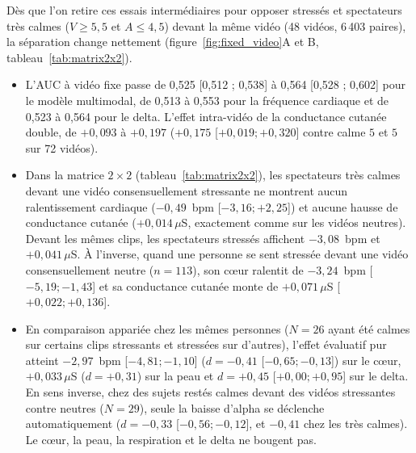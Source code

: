 \documentclass[10pt]{article}
\begin{document}
Dès que l'on retire ces essais intermédiaires pour opposer stressés et spectateurs très calmes ($V \ge 5{,}5$ et $A \le 4{,}5$) devant la même vidéo (48 vidéos, 6\,403 paires), la séparation change nettement (figure~\ref{fig:fixed_video}A et B, tableau~\ref{tab:matrix2x2}).
\begin{itemize}
\item L'AUC à vidéo fixe passe de 0,525 [0,512 ; 0,538] à 0,564 [0,528 ; 0,602] pour le modèle multimodal, de 0,513 à 0,553 pour la fréquence cardiaque et de 0,523 à 0,564 pour le delta. L'effet intra-vidéo de la conductance cutanée double, de $+0{,}093$ à $+0{,}197$ ($+0{,}175$ [$+0{,}019 ; +0{,}320$] contre calme $5$ et $5$ sur 72 vidéos).
\item Dans la matrice $2 \times 2$ (tableau~\ref{tab:matrix2x2}), les spectateurs très calmes devant une vidéo consensuellement stressante ne montrent aucun ralentissement cardiaque ($-0{,}49$~bpm [$-3{,}16 ; +2{,}25$]) et aucune hausse de conductance cutanée ($+0{,}014\,\mu$S, exactement comme sur les vidéos neutres). Devant les mêmes clips, les spectateurs stressés affichent $-3{,}08$~bpm et $+0{,}041\,\mu$S. À l'inverse, quand une personne se sent stressée devant une vidéo consensuellement neutre ($n = 113$), son cœur ralentit de $-3{,}24$~bpm [$-5{,}19 ; -1{,}43$] et sa conductance cutanée monte de $+0{,}071\,\mu$S [$+0{,}022 ; +0{,}136$].
\item En comparaison appariée chez les mêmes personnes ($N = 26$ ayant été calmes sur certains clips stressants et stressées sur d'autres), l'effet évaluatif pur atteint $-2{,}97$~bpm [$-4{,}81 ; -1{,}10$] ($d = -0{,}41$ [$-0{,}65 ; -0{,}13$]) sur le cœur, $+0{,}033\,\mu$S ($d = +0{,}31$) sur la peau et $d = +0{,}45$ [$+0{,}00 ; +0{,}95$] sur le delta. En sens inverse, chez des sujets restés calmes devant des vidéos stressantes contre neutres ($N = 29$), seule la baisse d'alpha se déclenche automatiquement ($d = -0{,}33$ [$-0{,}56 ; -0{,}12$], et $-0{,}41$ chez les très calmes). Le cœur, la peau, la respiration et le delta ne bougent pas.
\end{itemize}
\end{document}
